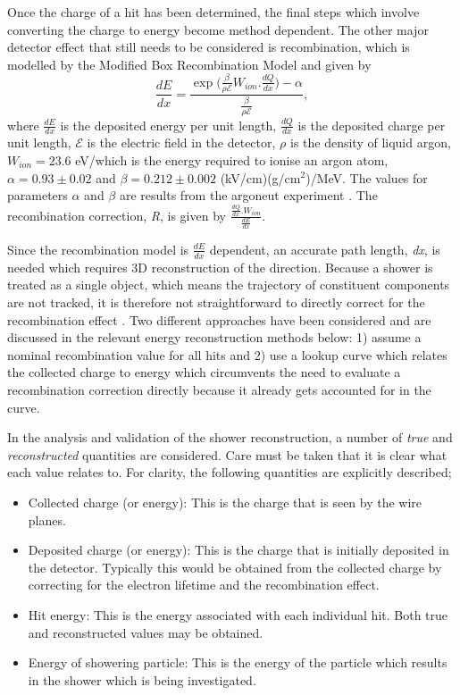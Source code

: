 Once the charge of a hit has been determined, the final steps which involve converting the charge to energy become method dependent. The other major detector effect that still needs to be considered is recombination, which is modelled by the Modified Box Recombination Model and given by  
\begin{equation}\label{eqn:ModBox}
    \frac{dE}{dx} = \frac{\exp{(\frac{\beta}{\rho \mathcal{E}} W_{ion}.\frac{dQ}{dx}}) - \alpha}{\frac{\beta}{\rho \mathcal{E}}},
\end{equation}
where $\frac{dE}{dx}$ is the deposited energy per unit length, $\frac{dQ}{dx}$ is the deposited charge per unit length,  $\mathcal{E}$ is the electric field in the detector, $\rho$ is the density of liquid argon, $W_{ion} = 23.6$ eV/\electron which is the energy required to ionise an argon atom, $\alpha = 0.93 \pm 0.02$ and $\beta = 0.212 \pm 0.002$ (kV/cm)(g/cm$^2$)/MeV. The values for parameters $\alpha$ and $\beta$ are results from the \Gls{argoneut} experiment \cite{ArgoNeuT_recombination_paper}. The recombination correction, \textit{R}, is given by $\frac{\frac{dQ}{dx}.W_{ion}}{\frac{dE}{dx}}$.


Since the recombination model is $\frac{dE}{dx}$ dependent, an accurate path length, \textit{dx}, is needed which requires 3D reconstruction of the direction. Because a shower is treated as a single object, which means the trajectory of constituent components are not tracked, it is therefore not straightforward to directly correct for the recombination effect \cite{MicroBooNE_photon_Ereco_paper}. Two different approaches have been considered and are discussed in the relevant energy reconstruction methods below: 1) assume a nominal recombination value for all hits and 2) use a lookup curve which relates the collected charge to energy which circumvents the need to evaluate a recombination correction directly because it already gets accounted for in the curve.

In the analysis and validation of the shower reconstruction, a number of \textit{true} and \textit{reconstructed} quantities are considered. Care must be taken that it is clear what each value relates to. For clarity, the following quantities are explicitly described;
\begin{itemize}
    \item Collected charge (or energy): This is the charge that is seen by the wire planes. 
    \item Deposited charge (or energy): This is the charge that is initially deposited in the detector. Typically this would be obtained from the collected charge by correcting for the electron lifetime and the recombination effect.
    \item Hit energy: This is the energy associated with each individual hit. Both true and reconstructed values may be obtained.
    \item Energy of showering particle: This is the energy of the particle which results in the shower which is being investigated. 
\end{itemize}
